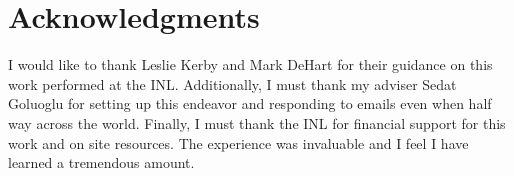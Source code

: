 \documentclass[11pt]{article}
\begin{document}
\section{Acknowledgments}
I would like to thank Leslie Kerby and Mark DeHart for their guidance on this work performed at the INL.  Additionally, I must thank my adviser Sedat Goluoglu for setting up this endeavor and responding to emails even when half way across the world.  
Finally, I must thank the INL for financial support for this work and on site resources.  The experience was invaluable and I feel I have learned a tremendous amount.



\end{document}
